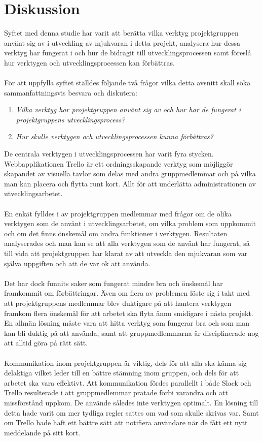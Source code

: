\section{Diskussion}
\label{cha:jonathan-diskussion}
Syftet med denna studie har varit att berätta vilka verktyg projektgruppen använt sig av i utveckling av mjukvaran i detta projekt, analysera hur dessa verktyg har fungerat i och hur de bidragit till utvecklingsprocessen samt föreslå hur verktygen och utvecklingsprocessen kan förbättras.
\\\\
För att uppfylla syftet ställdes följande två frågor vilka detta avsnitt skall söka sammanfattningsvis besvara och diskutera: 
\begin{enumerate}
\item \textit{Vilka verktyg har projektgruppen använt sig av och hur har de fungerat i projektgruppens utvecklingsprocess?}
\item \textit{Hur skulle verktygen och utvecklingsprocessen kunna förbättras?}
\end{enumerate}
\noindent
De centrala verktygen i utvecklingsprocessen har varit fyra stycken. Webbapplikationen Trello är ett ordningsskapande verktyg som möjliggör skapandet av visuella tavlor som delas med andra gruppmedlemmar och på vilka man kan placera och flytta runt kort. Allt för att underlätta administrationen av utvecklingsarbetet.
\\\\
En enkät fylldes i av projektgruppen medlemmar med frågor om de olika verktygen som de använt i utvecklingsarbetet, om vilka problem som uppkommit och om det finns önskemål om andra funktioner i verktygen. Resultaten analyserades och man kan se att alla verktygen som de använt har fungerat, så till vida att projektgruppen har klarat av att utveckla den mjukvaran som var själva uppgiften och att de var ok att använda.
\\\\
Det har dock funnits saker som fungerat mindre bra och önskemål har framkommit om förbättringar. Även om flera av problemen löste sig i takt med att projektgruppens medlemmar blev duktigare på att hantera verktygen framkom flera önskemål för att arbetet ska flyta ännu smidigare i nästa projekt. En allmän lösning måste vara att hitta verktyg som fungerar bra och som man kan bli duktig på att använda, samt att gruppmedlemmarna är disciplinerade nog att alltid göra på rätt sätt.
\\\\
Kommunikation inom projektgruppen är viktig, dels för att alla ska känna sig delaktiga vilket leder till en bättre stämning inom gruppen, och dels för att arbetet ska vara effektivt. Att kommunikation fördes parallellt i både Slack och Trello resulterade i att gruppmedlemmar pratade förbi varandra och att missförstånd uppkom. De använde således inte verktygen optimalt. En lösning till detta hade varit om mer tydliga regler sattes om vad som skulle skrivas var. Samt om Trello hade haft ett bättre sätt att notifiera användare när de fått ett nytt meddelande på sitt kort.
